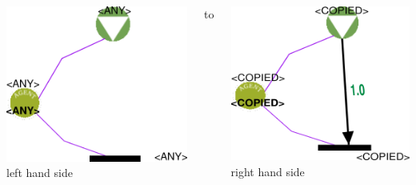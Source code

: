 \documentclass[12pt]{beamer}
\begin{document}
\begin{frame}

\begin{columns}
	
		 \begin{center}	
	\includegraphics[scale=2]{L9} \\
	left hand side
	\end{center}
	
		to
	 \begin{center}	
	\includegraphics[scale=1.7]{R9} \\
	right hand side
	\end{center} 
	
\end{columns}

\end{frame}
\end{document}

